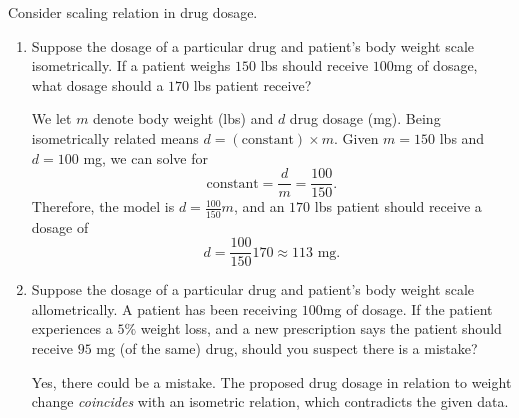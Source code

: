\documentclass[../main.tex]{subfiles}
\begin{document}
\begin{exercise}
  Consider scaling relation in drug dosage.
  \begin{enumerate}
    \item Suppose the dosage of a particular drug and patient's body weight scale isometrically.  If a patient weighs \(150\) lbs should receive \(100\)mg of dosage, what dosage should a \(170\) lbs patient receive?

      \begin{solution}
        We let \(m\) denote body weight (lbs) and \(d\) drug dosage (mg).  Being isometrically related means \(d = (\text{constant}) \times m\). Given \(m = 150\) lbs and \(d = 100\) mg, we can solve for \[\text{constant} = \frac{d}{m} = \frac{100}{150}.\]  Therefore, the model is \(d = \frac{100}{150} m\), and an \(170\) lbs patient should receive a dosage of \[d = \frac{100}{150} 170 \approx 113 \text{ mg}.\]
      \end{solution}

    \item Suppose the dosage of a particular drug and patient's body weight scale allometrically.  A patient has been receiving \(100\)mg of dosage. If the patient experiences a \(5\%\) weight loss, and a new prescription says the patient should receive \(95\) mg (of the same) drug, should you suspect there is a mistake?

      \begin{solution}
        Yes, there could be a mistake. The proposed drug dosage in relation to weight change \emph{coincides} with an isometric relation, which contradicts the given data. 
      \end{solution}
  \end{enumerate}
\end{exercise}
\end{document}
